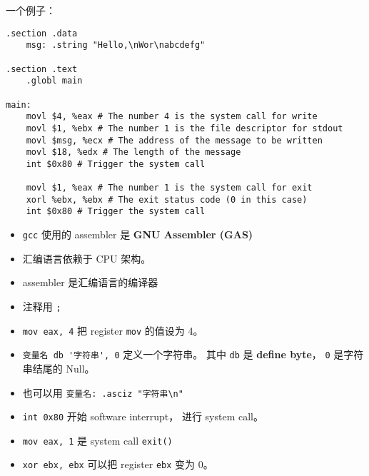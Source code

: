 
\begin{issues}
\issueDraft
\end{issues}

一个例子：
\begin{lstlisting}[language=none]
.section .data
    msg: .string "Hello,\nWor\nabcdefg"

.section .text
    .globl main

main:
    movl $4, %eax # The number 4 is the system call for write
    movl $1, %ebx # The number 1 is the file descriptor for stdout
    movl $msg, %ecx # The address of the message to be written
    movl $18, %edx # The length of the message
    int $0x80 # Trigger the system call

    movl $1, %eax # The number 1 is the system call for exit
    xorl %ebx, %ebx # The exit status code (0 in this case)
    int $0x80 # Trigger the system call
\end{lstlisting}

\begin{itemize}
\item \verb|gcc| 使用的 assembler 是 \textbf{GNU Assembler (GAS)}
\item 汇编语言依赖于 CPU 架构。
\item assembler 是汇编语言的编译器
\item 注释用 \verb|;|
\item \verb|mov eax, 4| 把 register \verb|mov| 的值设为 4。
\item \verb|变量名 db '字符串', 0| 定义一个字符串。 其中 \verb|db| 是 \textbf{define byte}， \verb|0| 是字符串结尾的 Null。
\item 也可以用 \verb|变量名: .asciz "字符串\n"|
\item \verb|int 0x80| 开始 software interrupt， 进行 system call。
\item \verb|mov eax, 1| 是 system call \verb|exit()|
\item \verb|xor ebx, ebx| 可以把 register \verb|ebx| 变为 0。
\end{itemize}
